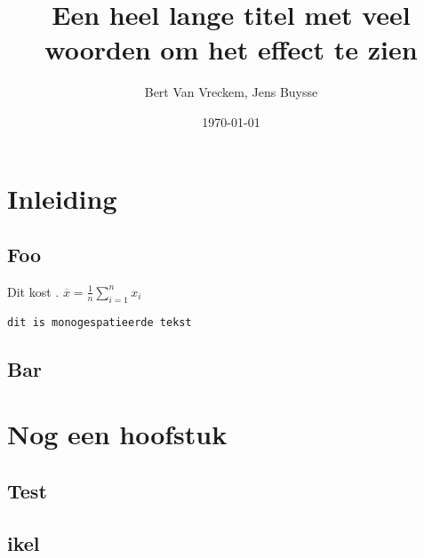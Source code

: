\documentclass{hogent-report}
\title{Een heel lange titel met veel woorden om het effect te zien}
\author{Bert {Van Vreckem}, Jens Buysse}
\date{\today}
\begin{document}
  \usechapterimagefalse
  
  \inserttitlepage[hgblue]
  
  \tableofcontents
  
  \chapter{Inleiding}
  
  \lipsum[1]
  
  \section{Foo}
  
  Dit kost . $\overline{x} = \frac{1}{n} \sum_{i = 1}^{n} x_i$
  
  \texttt{dit is monogespatieerde tekst}
  
  \lipsum[2-3]
  
  \section{Bar}
  
  \lipsum[4-6]
  
  \chapter{Nog een hoofstuk}
  
  \lipsum[7]
  
  \section{Test}
  
  \lipsum[8-10]
  
  \section{ikel}
  
  \lipsum[11-15]
  
\end{document}
